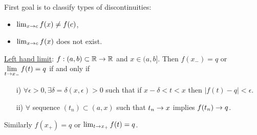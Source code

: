 \documentclass[]{article}
\begin{document}
First goal is to classify types of discontinuities:
\begin{itemize}
	\item $\lim_{x\rightarrow c} f(x) \neq f(c)$,
	\item $\lim_{x\rightarrow c} f(x)$ does not exist.
\end{itemize}
\ul{Left hand limit}: $f:(a,b)\subset\mathbb{R}\rightarrow\mathbb{R}$ and $x\in(a,b]$. Then $f(x_-) = q$ or $\displaystyle\lim_{t\rightarrow x_-} f(t) = q$ if and only if
\begin{enumerate}
	\item[i)] $\forall\epsilon>0,\exists\delta=\delta(x,\epsilon)>0$ such that if $x-\delta < t < x$ then $|f(t)-q|<\epsilon$.
	\item[ii)] $\forall$ sequence $(t_n)\subset(a,x)$ such that $t_n\rightarrow x$ implies $f(t_n)\rightarrow q$.
\end{enumerate}
Similarly $f(x_+)=q$ or $\lim_{t\rightarrow x_+}f(t) = q$.
\end{document}
